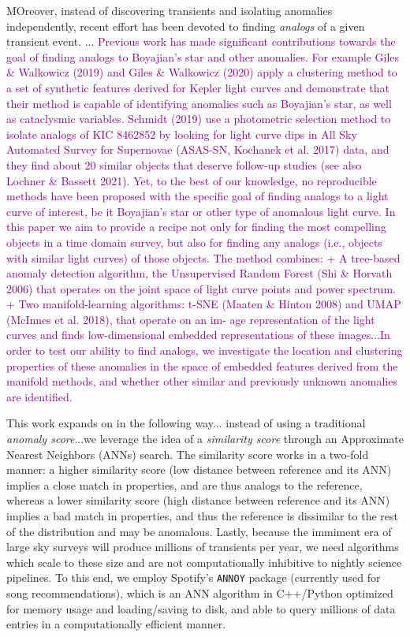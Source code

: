 \documentclass[twocolumn]{aastex63}
\newcommand{\annoy}{\texttt{ANNOY}}
\newcommand{\pat}{\textcolor{purple}}
\begin{document}
MOreover, instead of discovering transients and isolating anomalies independently, recent effort has been devoted to finding \emph{analogs} of a given transient event. \citep{Galarza2021}... \pat{Previous work has made significant contributions towards the goal of finding analogs to Boyajian’s star and other anomalies. For example Giles \& Walkowicz (2019) and Giles \& Walkowicz (2020) apply a clustering method to a set of synthetic features derived for Kepler light curves and demonstrate that their method is capable of identifying anomalies such as Boyajian’s star, as well as cataclysmic variables. Schmidt (2019) use a photometric selection method to isolate analogs of KIC 8462852 by looking for light curve dips in All Sky Automated Survey for Supernovae (ASAS-SN, Kochanek et al. 2017) data, and they find about 20 similar objects that deserve follow-up studies (see also Lochner \& Bassett 2021). Yet, to the best of our knowledge, no reproducible methods have been proposed with the specific goal of finding analogs to a light curve of interest, be it Boyajian’s star or other type of anomalous light curve. In this paper we aim to provide a recipe not only for finding the most compelling objects in a time domain survey, but also for finding any analogs (i.e., objects with similar light curves) of those objects. The method combines: + A tree-based anomaly detection algorithm, the Unsupervised Random Forest (Shi \& Horvath 2006) that operates on the joint space of light curve points and power spectrum. + Two manifold-learning algorithms: t-SNE (Maaten \& Hinton 2008) and UMAP (McInnes et al. 2018), that operate on an im- age representation of the light curves and finds low-dimensional embedded representations of these images...In order to test our ability to find analogs, we investigate the location and clustering properties of these anomalies in the space of embedded features derived from the manifold methods, and whether other similar and previously unknown anomalies are identified.}

This work expands on \citep{Galarza2021} in the following way... instead of using a traditional \emph{anomaly score}...we leverage the idea of a \emph{similarity score} through an Approximate Nearest Neighbors (ANNs) search. The similarity score works in a two-fold manner: a higher similarity score (low distance between reference and its ANN) implies a close match in properties, and are thus analogs to the reference, whereas a lower similarity score (high distance between reference and its ANN) implies a bad match in properties, and thus the reference is dissimilar to the rest of the distribution and may be anomalous. Lastly, because the immiment era of large sky surveys will produce millions of transients per year, we need algorithms which scale to these size and are not computationally inhibitive to nightly science pipelines. To this end, we employ Spotify's \annoy{} package (currently used for song recommendations), which is an ANN algorithm in C++/Python optimized for memory usage and loading/saving to disk, and able to query millions of data entries in a computationally efficient manner.
\end{document}
